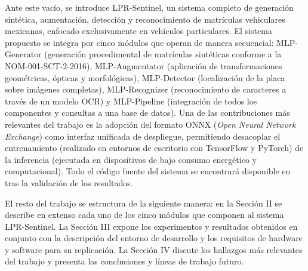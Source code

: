 Ante este vacío, se introduce LPR-Sentinel, un sistema completo de generación sintética, aumentación, detección y reconocimiento de matrículas vehiculares mexicanas, enfocado exclusivamente en vehículos particulares. El sistema propuesto se integra por cinco módulos que operan de manera secuencial: MLP-Generator (generación procedimental de matrículas sintéticas conforme a la NOM-001-SCT-2-2016), MLP-Augmentator (aplicación de transformaciones geométricas, ópticas y morfológicas), MLP-Detector (localización de la placa sobre imágenes completas), MLP-Recognizer (reconocimiento de caracteres a través de un modelo OCR) y MLP-Pipeline (integración de todos los componentes y consultas a una base de datos). Una de las contribuciones más relevantes del trabajo es la adopción del formato ONNX (\textit{Open Neural Network Exchange}) como interfaz unificada de despliegue, permitiendo desacoplar el entrenamiento (realizado en entornos de escritorio con TensorFlow y PyTorch) de la inferencia (ejecutada en dispositivos de bajo consumo energético y computacional). Todo el código fuente del sistema se encontrará disponible en \cite{murillolog2026} tras la validación de los resultados.

El resto del trabajo se estructura de la siguiente manera: en la Sección II se describe en extenso cada uno de los cinco módulos que componen al sistema LPR-Sentinel. La Sección III expone los experimentos y resultados obtenidos en conjunto con la descripción del entorno de desarrollo y los requisitos de hardware y software para su replicación. La Sección IV discute los hallazgos más relevantes del trabajo y presenta las conclusiones y líneas de trabajo futuro.
